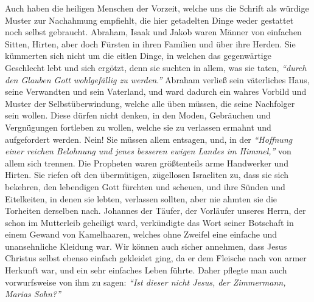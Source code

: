 Auch haben die heiligen Menschen der Vorzeit, welche uns die
Schrift als würdige
Muster zur Nachahmung empfiehlt, die hier getadelten Dinge weder gestattet noch
selbst gebraucht. Abraham, Isaak
und
Jakob waren Männer von einfachen Sitten,
Hirten, aber doch Fürsten in ihren Familien und über ihre Herden. Sie
kümmerten sich nicht um die eitlen Dinge, in welchen das gegenwärtige
Geschlecht lebt und sich ergötzt, denn sie suchten in allem, was sie taten,
\textit{"`durch den Glauben Gott wohlgefällig zu werden."'} Abraham verließ sein
väterliches Haus, seine Verwandten und sein Vaterland, und ward dadurch ein
wahres Vorbild und Muster der
Selbstüberwindung, welche alle üben müssen, die
seine Nachfolger sein wollen. Diese dürfen nicht denken, in den Moden,
Gebräuchen und Vergnügungen fortleben zu wollen, welche sie zu verlassen
ermahnt und aufgefordert werden. Nein! Sie müssen allem
entsagen, und, in der
\textit{"`Hoffnung einer reichen Belohnung und jenes besseren ewigen Landes im
Himmel,"'}
von allem sich trennen. Die
Propheten waren größtenteils arme Handwerker und
Hirten.
Sie riefen oft den übermütigen, zügellosen
Israeliten zu, dass sie
sich bekehren,
den lebendigen Gott fürchten und scheuen, und ihre
Sünden und Eitelkeiten, in
denen sie lebten, verlassen sollten, aber nie ahmten sie die Torheiten
derselben nach. Johannes der Täufer, der
Vorläufer unseres
Herrn, der schon im
Mutterleib geheiligt ward, verkündigte das Wort seiner Botschaft
in einem
Gewand von Kamelhaaren, welches ohne Zweifel eine einfache und unansehnliche
Kleidung war.
Wir können auch sicher annehmen,
dass Jesus Christus selbst ebenso einfach gekleidet ging, da er dem Fleische
nach von armer Herkunft war, und ein sehr einfaches
Leben
führte. Daher pflegte
man auch vorwurfsweise von ihm zu sagen:
\textit{"`Ist dieser nicht Jesus, der
Zimmermann, Marias Sohn?"'}
